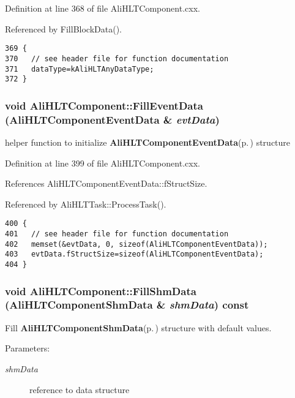 Definition at line 368 of file Ali\-HLTComponent.cxx.

Referenced by Fill\-Block\-Data().

\footnotesize\begin{verbatim}369 {
370   // see header file for function documentation
371   dataType=kAliHLTAnyDataType;
372 }
\end{verbatim}\normalsize 


\subsubsection{\setlength{\rightskip}{0pt plus 5cm}void Ali\-HLTComponent::Fill\-Event\-Data ({\bf Ali\-HLTComponent\-Event\-Data} \& {\em evt\-Data})\hspace{0.3cm}{\tt  [static]}}\label{classAliHLTComponent_e3}


helper function to initialize {\bf Ali\-HLTComponent\-Event\-Data}{\rm (p.\,\pageref{structAliHLTComponentEventData})} structure 

Definition at line 399 of file Ali\-HLTComponent.cxx.

References Ali\-HLTComponent\-Event\-Data::f\-Struct\-Size.

Referenced by Ali\-HLTTask::Process\-Task().

\footnotesize\begin{verbatim}400 {
401   // see header file for function documentation
402   memset(&evtData, 0, sizeof(AliHLTComponentEventData));
403   evtData.fStructSize=sizeof(AliHLTComponentEventData);
404 }
\end{verbatim}\normalsize 


\subsubsection{\setlength{\rightskip}{0pt plus 5cm}void Ali\-HLTComponent::Fill\-Shm\-Data ({\bf Ali\-HLTComponent\-Shm\-Data} \& {\em shm\-Data}) const\hspace{0.3cm}{\tt  [protected]}}\label{classAliHLTComponent_b1}


Fill {\bf Ali\-HLTComponent\-Shm\-Data}{\rm (p.\,\pageref{structAliHLTComponentShmData})} structure with default values. \begin{Desc}
\item[Parameters:]
\begin{description}
\item[{\em shm\-Data}]reference to data structure \end{description}
\end{Desc}


